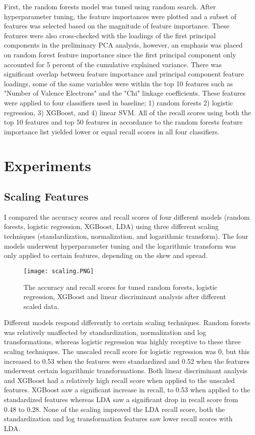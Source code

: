 \documentclass{article}
\begin{document}
\begin{itemize}
First, the random forests model was tuned using random search. After hyperparameter tuning, the feature importances were plotted and a subset of features was selected based on the magnitude of feature importance. These features were also cross-checked with the loadings of the first principal components in the preliminary PCA analysis, however, an emphasis was placed on random forest feature importance since the first principal component only accounted for 5 percent of the cumulative explained variance. There was significant overlap between feature importance and principal component feature loadings, some of the same variables were within the top 10 features such as "Number of Valence Electrons" and the "Chi" linkage coefficients. These features were applied to four classifiers used in baseline; 1) random forests 2) logistic regression, 3) XGBoost, and 4) linear SVM. All of the recall scores using both the top 10 features and top 50 features in accordance to the random forests feature importance list yielded lower or equal recall scores in all four classifiers. 

\section{Experiments}

\subsection{Scaling Features}

I compared the accuracy scores and recall scores of four different models (random forests, logistic regression, XGBoost, LDA)  using three different scaling techniques (standardization, normalization, and logarithmic transform). The four models underwent hyperparameter tuning and the logarithmic transform was only applied to certain features, depending on the skew and spread. 



\begin{figure}[hbt!]
\texttt{[image: scaling.PNG]}
\caption{The accuracy and recall scores for tuned random forests, logistic regression, XGBoost and linear discriminant analysis after different scaled data.}
\end{figure}

Different models respond differently to certain scaling techniques. Random forests was relatively unaffected by standardization, normalization and log transformations, whereas logistic regression was highly receptive to these three scaling techniques. The unscaled recall score for logistic regression was 0, but this increased to 0.53 when the features were standardized and 0.52 when the features underwent certain logarithmic transformations. Both linear discriminant analysis and XGBoost had a relatively high recall score when applied to the unscaled features. XGBoost saw a significant increase in recall, to 0.53 when applied to the standardized features whereas LDA saw a significant drop in recall score from 0.48 to 0.28. None of the scaling improved the LDA recall score, both the standardization and log transformation features saw lower recall scores with LDA. 


\end{itemize}
\end{document}
